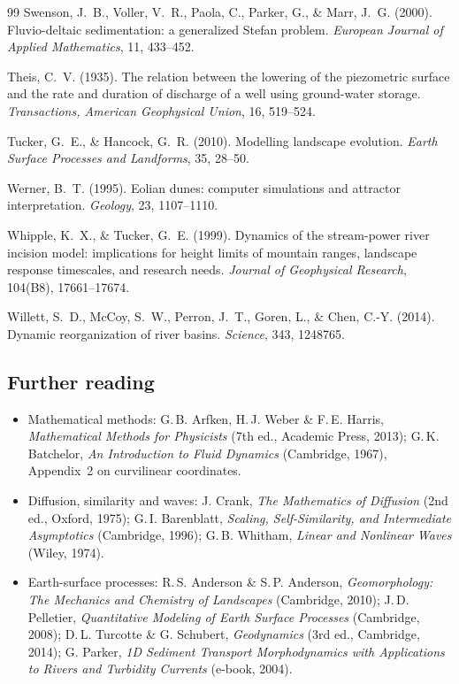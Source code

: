 \documentclass[11pt,letterpaper]{article}
\numberwithin{equation}{section}
\begin{document}
\begin{thebibliography}{99}
Swenson, J.~B., Voller, V.~R., Paola, C., Parker, G., \& Marr, J.~G. (2000). Fluvio-deltaic sedimentation: a generalized Stefan
problem. \emph{European Journal of Applied Mathematics}, 11, 433--452.

Theis, C.~V. (1935). The relation between the lowering of the piezometric surface and the rate and duration of discharge of a
well using ground-water storage. \emph{Transactions, American Geophysical Union}, 16, 519--524.

Tucker, G.~E., \& Hancock, G.~R. (2010). Modelling landscape evolution. \emph{Earth Surface Processes and Landforms}, 35, 28--50.

Werner, B.~T. (1995). Eolian dunes: computer simulations and attractor interpretation. \emph{Geology}, 23, 1107--1110.

Whipple, K.~X., \& Tucker, G.~E. (1999). Dynamics of the stream-power river incision model: implications for height limits of
mountain ranges, landscape response timescales, and research needs. \emph{Journal of Geophysical Research}, 104(B8),
17661--17674.

Willett, S.~D., McCoy, S.~W., Perron, J.~T., Goren, L., \& Chen, C.-Y. (2014). Dynamic reorganization of river basins.
\emph{Science}, 343, 1248765.

\end{thebibliography}

\subsection*{Further reading}
{\small
\begin{itemize}[leftmargin=1.2em]
  \item Mathematical methods: G.\,B. Arfken, H.\,J. Weber \& F.\,E. Harris, \emph{Mathematical Methods for Physicists} (7th ed., Academic
        Press, 2013); G.\,K. Batchelor, \emph{An Introduction to Fluid Dynamics} (Cambridge, 1967), Appendix~2 on curvilinear coordinates.
  \item Diffusion, similarity and waves: J. Crank, \emph{The Mathematics of Diffusion} (2nd ed., Oxford, 1975); G.\,I. Barenblatt,
        \emph{Scaling, Self-Similarity, and Intermediate Asymptotics} (Cambridge, 1996); G.\,B. Whitham, \emph{Linear and Nonlinear Waves}
        (Wiley, 1974).
  \item Earth-surface processes: R.\,S. Anderson \& S.\,P. Anderson, \emph{Geomorphology: The Mechanics and Chemistry of Landscapes}
        (Cambridge, 2010); J.\,D. Pelletier, \emph{Quantitative Modeling of Earth Surface Processes} (Cambridge, 2008);
        D.\,L. Turcotte \& G. Schubert, \emph{Geodynamics} (3rd ed., Cambridge, 2014); G. Parker, \emph{1D Sediment Transport
        Morphodynamics with Applications to Rivers and Turbidity Currents} (e-book, 2004).
\end{itemize}}
\end{document}
